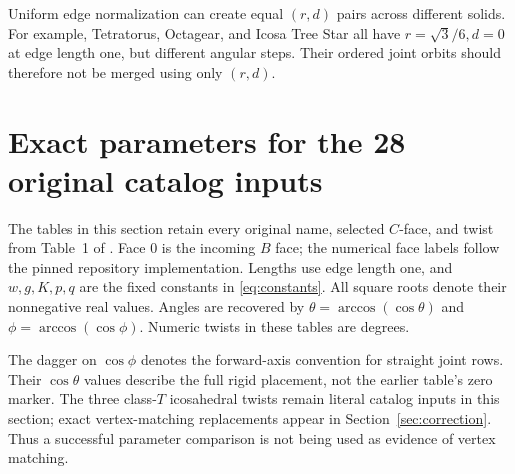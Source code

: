 \documentclass[11pt]{article}
\theoremstyle{definition}
\begin{document}
Uniform edge normalization can create equal $(r,d)$ pairs across different
solids. For example, Tetratorus, Octagear, and Icosa Tree Star all have
$r=\sqrt3/6,d=0$ at edge length one, but different angular steps. Their
ordered joint orbits should therefore not be merged using only $(r,d)$.

\section{Exact parameters for the 28 original catalog inputs}\label{sec:catalog}
The tables in this section retain every original name, selected $C$-face,
and twist from Table~1 of \cite{read2022}. Face $0$ is the incoming $B$ face;
the numerical face labels follow the pinned repository implementation.
Lengths use edge length one, and $w,g,K,p,q$ are the fixed constants in
\eqref{eq:constants}. All square roots denote their nonnegative real values.
Angles are recovered by $\theta=\arccos(\cos\theta)$ and
$\phi=\arccos(\cos\phi)$. Numeric twists in these tables are degrees.

The dagger on $\cos\phi$ denotes the forward-axis convention for straight
joint rows. Their $\cos\theta$ values describe the full rigid placement,
not the earlier table's zero marker. The three class-$T$ icosahedral twists
remain literal catalog inputs in this section; exact vertex-matching
replacements appear in Section~\ref{sec:correction}. Thus a successful
parameter comparison is not being used as evidence of vertex matching.
\end{document}
